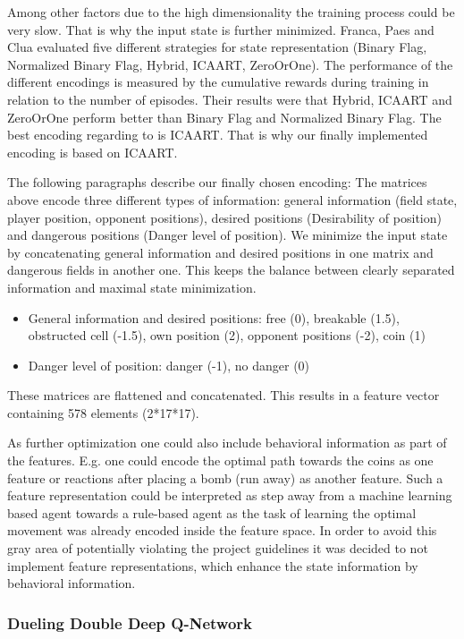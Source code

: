 Among other factors due to the high dimensionality the training process could be very slow. That is why the input state is further minimized.
Franca, Paes and Clua \cite{Franca2019} evaluated five different strategies for state representation (Binary Flag, Normalized Binary Flag, Hybrid, ICAART, ZeroOrOne). The performance of the different encodings is measured by the cumulative rewards during training in relation to the number of episodes. Their results were that Hybrid, ICAART and ZeroOrOne perform better than Binary Flag and Normalized Binary Flag. The best encoding regarding to \cite{Franca2019} is ICAART. That is why our finally implemented encoding is based on ICAART.

The following paragraphs describe our finally chosen encoding:
The matrices above encode three different types of information:
general information (field state, player position, opponent positions), desired positions (Desirability of position) and dangerous positions (Danger level of position).
We minimize the input state by concatenating general information and desired positions in one matrix and dangerous fields in another one. This keeps the balance between clearly separated information and maximal state minimization.

\begin{itemize}
	\item General information and desired positions: free (0), breakable (1.5), obstructed cell (-1.5), own position (2), opponent positions (-2), coin (1)
	\item Danger level of position: danger (-1), no danger (0)
\end{itemize}
These matrices are flattened and concatenated. This results in a feature vector containing 578 elements (2*17*17).

As further optimization one could also include behavioral information as part of the features. E.g. one could encode the optimal path towards the coins as one feature or reactions after placing a bomb (run away) as another feature. Such a feature representation could be interpreted as step away from a machine learning based agent towards a rule-based agent as the task of learning the optimal movement was already encoded inside the feature space. In order to avoid this gray area of potentially violating the project guidelines it was decided to not implement feature representations, which enhance the state information by behavioral information.

\subsubsection{Dueling Double Deep Q-Network}
\label{ch:approachAb}

